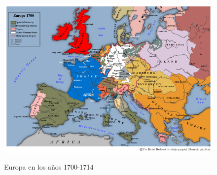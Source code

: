 \begin{figure}[!h] 
	\caption{Europa en los años 1700-1714} 
	\centering
	\includegraphics[width=140mm]{capitulos/img/Europe1700-14} 
	\label{fig:Europe1700} 
\end{figure}

